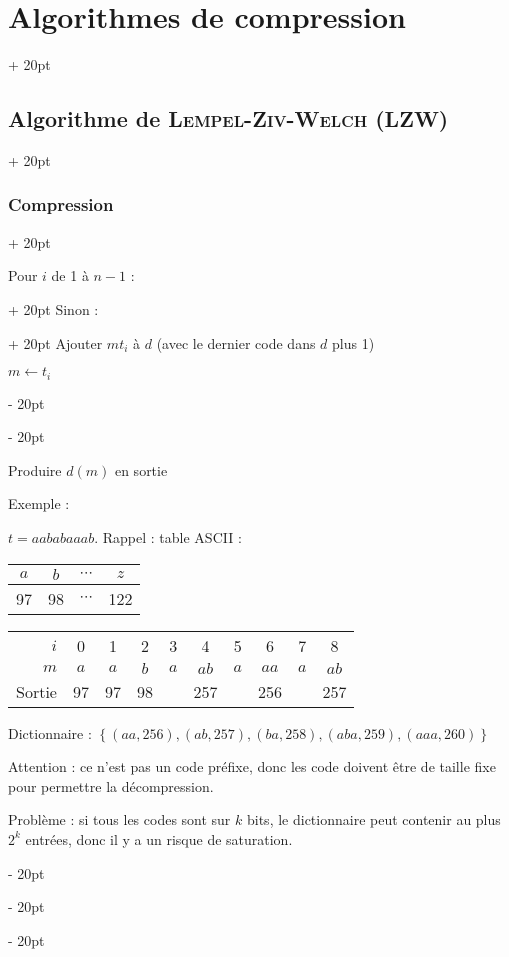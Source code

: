 \documentclass[a4paper, 12pt, twoside]{article}
\newcommand{\set}[1]{\left\{ #1 \right\}}
\newcommand{\ind}[1][20pt]{\advance\leftskip + #1}
\newcommand{\deind}[1][20pt]{\advance\leftskip - #1}
\newenvironment{indt}[2][20pt]{#2 \par \ind[#1]}{\par \deind} %
\begin{document}
\begin{indt}{\section{Algorithmes de compression}}
\begin{indt}{\subsection{Algorithme de \textsc{Lempel-Ziv-Welch} (LZW)}}
\begin{indt}{\subsubsection{Compression}}
\begin{pseudocode}
\begin{indt}{Pour $i$ de 1 à $ n - 1$ :}
\begin{indt}{Sinon :}
                            Ajouter $m t_i$ à $d$ (avec le dernier code dans $d$ plus 1)

                            $m \leftarrow t_i$
                        \end{indt}
                    \end{indt}

                    \vspace{6pt}
                    
                    Produire $d(m)$ en sortie
                \end{pseudocode}

                \vspace{12pt}
                
                Exemple :

                $t = aababaaab$.
                Rappel : table ASCII :
                \begin{tabular}{|c|c|c|c|}
                    \hline
                    $a$ & $b$ & $\cdots$ & $z$
                    \\
                    \hline
                    97 & 98 & $\cdots$ & 122
                    \\
                    \hline
                \end{tabular}

                \vspace{6pt}
                
                \begin{tabular}{r|ccccccccc}
                    $i$ & 0 & 1 & 2 & 3 & 4 & 5 & 6 & 7 & 8
                    \\
                    $m$ & $a$ & $a$ & $b$ & $a$ & $ab$ & $a$ & $aa$ & $a$ & $ab$
                    \\
                    Sortie & 97 & 97 & 98 & & 257 & & 256 & & 257
                \end{tabular}

                Dictionnaire : $\set{(aa, 256), (ab, 257), (ba, 258), (aba, 259), (aaa, 260)}$

                \vspace{6pt}
                
                Attention : ce n'est pas un code préfixe, donc les code doivent être de taille fixe pour permettre la décompression.

                Problème : si tous les codes sont sur $k$ bits, le dictionnaire peut contenir au plus $2^k$ entrées, donc il y a un risque de saturation.


\end{indt}
\end{indt}
\end{indt}
\end{document}
